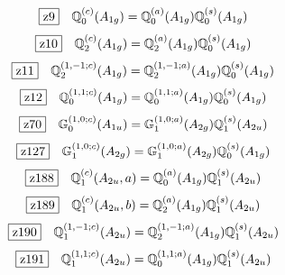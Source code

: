 \documentclass[fleqn,10pt,landscape]{jsarticle}
\begin{document}
\begin{dmath*}
\hspace*{3mm}\fbox{z9}\quad \mathbb{Q}_{0}^{(c)}(A_{1g})=\mathbb{Q}_{0}^{(a)}(A_{1g}) \mathbb{Q}_{0}^{(s)}(A_{1g})
\end{dmath*}
\begin{dmath*}
\hspace*{3mm}\fbox{z10}\quad \mathbb{Q}_{2}^{(c)}(A_{1g})=\mathbb{Q}_{2}^{(a)}(A_{1g}) \mathbb{Q}_{0}^{(s)}(A_{1g})
\end{dmath*}
\begin{dmath*}
\hspace*{3mm}\fbox{z11}\quad \mathbb{Q}_{2}^{(1,-1;c)}(A_{1g})=\mathbb{Q}_{2}^{(1,-1;a)}(A_{1g}) \mathbb{Q}_{0}^{(s)}(A_{1g})
\end{dmath*}
\begin{dmath*}
\hspace*{3mm}\fbox{z12}\quad \mathbb{Q}_{0}^{(1,1;c)}(A_{1g})=\mathbb{Q}_{0}^{(1,1;a)}(A_{1g}) \mathbb{Q}_{0}^{(s)}(A_{1g})
\end{dmath*}
\begin{dmath*}
\hspace*{3mm}\fbox{z70}\quad \mathbb{G}_{0}^{(1,0;c)}(A_{1u})=\mathbb{G}_{1}^{(1,0;a)}(A_{2g}) \mathbb{Q}_{1}^{(s)}(A_{2u})
\end{dmath*}
\begin{dmath*}
\hspace*{3mm}\fbox{z127}\quad \mathbb{G}_{1}^{(1,0;c)}(A_{2g})=\mathbb{G}_{1}^{(1,0;a)}(A_{2g}) \mathbb{Q}_{0}^{(s)}(A_{1g})
\end{dmath*}
\begin{dmath*}
\hspace*{3mm}\fbox{z188}\quad \mathbb{Q}_{1}^{(c)}(A_{2u},a)=\mathbb{Q}_{0}^{(a)}(A_{1g}) \mathbb{Q}_{1}^{(s)}(A_{2u})
\end{dmath*}
\begin{dmath*}
\hspace*{3mm}\fbox{z189}\quad \mathbb{Q}_{1}^{(c)}(A_{2u},b)=\mathbb{Q}_{2}^{(a)}(A_{1g}) \mathbb{Q}_{1}^{(s)}(A_{2u})
\end{dmath*}
\begin{dmath*}
\hspace*{3mm}\fbox{z190}\quad \mathbb{Q}_{1}^{(1,-1;c)}(A_{2u})=\mathbb{Q}_{2}^{(1,-1;a)}(A_{1g}) \mathbb{Q}_{1}^{(s)}(A_{2u})
\end{dmath*}
\begin{dmath*}
\hspace*{3mm}\fbox{z191}\quad \mathbb{Q}_{1}^{(1,1;c)}(A_{2u})=\mathbb{Q}_{0}^{(1,1;a)}(A_{1g}) \mathbb{Q}_{1}^{(s)}(A_{2u})
\end{dmath*}
\end{document}
